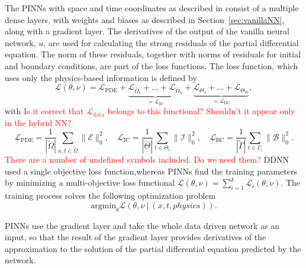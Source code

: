 The PINNs with space and time coordinates as described in \cite{??} consist of a multiple dense layers, with weights and biases as described in Section~\ref{sec:vanillaNN}, along with a gradient layer. The derivatives of the output of the vanilla neural network, $u$, are used for calculating the strong residuals of the 
partial differential equation. The norm of these residuals, together with norms of residuals for 
initial and boundary conditions, are part of the loss functions. The loss function, which uses only
the physics-based information is defined  by 
\begin{equation}\label{eq:fct_phys}
\mathcal{L}(\theta, \nu ) = \mathcal{L}_{\mathrm{PDE}}  + \underbrace{\mathcal{L}_{\bar{\Omega}_1} + \ldots  + \mathcal{L}_{\bar{\Omega}_n}}_{= \mathcal{L}_{\mathrm{IC}}}  + \underbrace{\mathcal{L}_{\Theta_1} +\ldots + \mathcal{L}_{\Theta_m}}_{= \mathcal{L}_{\mathrm{BC}} },
\end{equation}
with \textcolor{red}{Is it correct that $\mathcal{L}_{\mathrm{data}}$ belongs 
to this functional? Shouldn't it appear only in the hybrid NN?}
\[
\mathcal{L}_{\mathrm{PDE}} = \frac{1}{|\tilde{\Omega}|} \sum_{x,t \in \tilde{\Omega}} \| \mathcal{E}\|^2_0, \quad
\mathcal{L}_{\mathrm{IC}} = \frac{1}{|\tilde{\Theta}|} \sum_{t \in \Theta_i} \| \mathcal{I}\|^2_0, \quad  
\mathcal{L}_{\mathrm{BC}}  = \frac{1}{|\tilde{\Gamma}|} \sum_{t \in \Gamma_i} \| \mathcal{B}\|^2_0.
\]
\textcolor{red}{There are a number of undefined symbols included. Do we need them?}
DDNN used a single objective loss function,whereas  PINNs find the training parameters by minimizing a multi-objective loss functional $\mathcal{L} (\theta, \nu)  = \sum_{i=1}^k \mathcal{L}_i ( \theta , \nu)$.
The training process solves the following optimization problem 
\[
\mbox{argmin}_\theta \mathcal{L} (\theta, \nu \ | \ (x,t ,physics)).
\]

PINNs use the gradient layer and take the whole data driven network as an input, so that the result of the 
gradient layer provides derivatives of the approximation to the solution
of the partial differential equation predicted by the network. 


